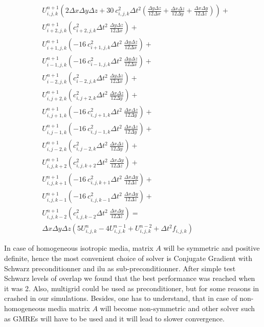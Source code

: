 \documentclass[12pt,a4paper]{report}
\begin{document}
\begin{equation}
\begin{aligned}
& U^{n+1}_{i,j,k} \left(2 \Delta x \Delta y \Delta z + 30\ c^2_{i,j,k} \Delta t^2 \left( \frac{\Delta y \Delta z}{12 \Delta x} + \frac{\Delta x \Delta z}{12 \Delta y}+ \frac{\Delta x \Delta y}{12 \Delta z}\right)\right) + \\
& U^{n+1}_{i+2,j,k}  \left(c^2_{i+2,j,k} \Delta t^2\ \frac{\Delta y \Delta z}{12 \Delta x}\right) + \\
& U^{n+1}_{i+1,j,k}  \left( -16\ c^2_{i+1,j,k} \Delta t^2\ \frac{\Delta y \Delta z}{12 \Delta x}\right) + \\
& U^{n+1}_{i-1,j,k}  \left( -16\ c^2_{i-1,j,k} \Delta t^2\ \frac{\Delta y \Delta z}{12 \Delta x}\right) + \\
& U^{n+1}_{i-2,j,k}  \left(c^2_{i-2,j,k} \Delta t^2\ \frac{\Delta y \Delta z}{12 \Delta x}\right) + \\
& U^{n+1}_{i,j+2,k}  \left(c^2_{i,j+2,k} \Delta t^2\ \frac{\Delta x \Delta z}{12 \Delta y}\right) + \\
& U^{n+1}_{i,j+1,k}  \left( -16\ c^2_{i,j+1,k} \Delta t^2\ \frac{\Delta x \Delta z}{12 \Delta y}\right) + \\
& U^{n+1}_{i,j-1,k}  \left( -16\ c^2_{i,j-1,k} \Delta t^2\ \frac{\Delta x \Delta z}{12 \Delta y}\right) + \\
& U^{n+1}_{i,j-2,k}  \left(c^2_{i,j-2,k} \Delta t^2\ \frac{\Delta x \Delta z}{12 \Delta y}\right) + \\
& U^{n+1}_{i,j,k+2}  \left(c^2_{i,j,k+2} \Delta t^2\ \frac{\Delta x \Delta y}{12 \Delta z}\right) + \\
& U^{n+1}_{i,j,k+1}  \left( -16\ c^2_{i,j,k+1} \Delta t^2\ \frac{\Delta x \Delta y}{12 \Delta z}\right) + \\
& U^{n+1}_{i,j,k-1}  \left( -16\ c^2_{i,j,k-1} \Delta t^2\ \frac{\Delta x \Delta y}{12 \Delta z}\right) + \\
& U^{n+1}_{i,j,k-2}  \left(c^2_{i,j,k-2} \Delta t^2\ \frac{\Delta x \Delta y}{12 \Delta z}\right) = \\
& \Delta x \Delta y \Delta z \left( 5 U^{n}_{i,j,k} - 4 U^{n-1}_{i,j,k} + U^{n-2}_{i,j,k} + \Delta t^2 f_{i,j,k} \right)
\end{aligned}
\end{equation}

In case of homogeneous isotropic media, matrix $A$ will be symmetric and positive definite, hence the most convenient choice of solver is Conjugate Gradient with Schwarz preconditionner and ilu as sub-preconditionner. After simple test Schwarz levels of overlap we found that the best performance was reached when it was 2. Also, multigrid could be used as preconditioner, but for some reasons in crashed in our simulations. Besides, one has to understand, that in case of non-homogeneous media matrix $A$ will become non-symmetric and other solver such as GMREs will have to be used and it will lead to slower convergence.
\end{document}
